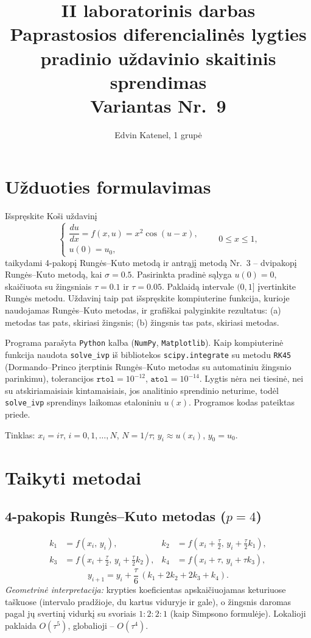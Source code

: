 \documentclass[12pt,a4paper]{article}
\title{\textbf{II laboratorinis darbas}\\[4pt]\large Paprastosios diferencialinės lygties pradinio uždavinio
skaitinis sprendimas\\ Variantas Nr.~9}
\author{Edvin Katenel, 1 grupė}
\date{}
\begin{document}
\maketitle

\section*{Užduoties formulavimas}
Išspręskite Koši uždavinį
\[
  \begin{cases}
    \dfrac{du}{dx}=f(x,u)=x^2\cos(u-x),\\[6pt]
    u(0)=u_0,
  \end{cases}
  \qquad 0\le x\le 1,
\]
taikydami 4-pakopį Rungės--Kuto metodą ir antrąjį metodą Nr.~3 -- dvipakopį Rungės--Kuto metodą,
kai $\sigma=0.5$. Pasirinkta pradinė sąlyga $u(0)=0$, skaičiuota su žingsniais $\tau=0.1$ ir
$\tau=0.05$. Paklaidą intervale $(0,1]$ įvertinkite Rungės metodu. Uždavinį taip pat išspręskite
kompiuterine funkcija, kurioje naudojamas Rungės--Kuto metodas, ir grafiškai palyginkite rezultatus:
(a) metodas tas pats, skiriasi žingsnis; (b) žingsnis tas pats, skiriasi metodas.

Programa parašyta \texttt{Python} kalba (\texttt{NumPy}, \texttt{Matplotlib}). Kaip kompiuterinė
funkcija naudota \texttt{solve\_ivp} iš bibliotekos \texttt{scipy.integrate} su metodu
\texttt{RK45} (Dormando--Princo įterptinis Rungės--Kuto metodas su automatiniu žingsnio
parinkimu), tolerancijos $\texttt{rtol}=10^{-12}$, $\texttt{atol}=10^{-14}$. Lygtis nėra nei
tiesinė, nei su atskiriamaisiais kintamaisiais, jos analitinio sprendinio neturime, todėl
\texttt{solve\_ivp} sprendinys laikomas etaloniniu $u(x)$. Programos kodas pateiktas priede.

Tinklas: $x_i=i\tau$, $i=0,1,\dots,N$, $N=1/\tau$; $y_i\approx u(x_i)$, $y_0=u_0$.

\section{Taikyti metodai}

\subsection{4-pakopis Rungės--Kuto metodas ($p=4$)}
\[
\begin{aligned}
  k_1&=f(x_i,\,y_i), &
  k_2&=f\!\left(x_i+\tfrac{\tau}{2},\,y_i+\tfrac{\tau}{2}k_1\right),\\
  k_3&=f\!\left(x_i+\tfrac{\tau}{2},\,y_i+\tfrac{\tau}{2}k_2\right), &
  k_4&=f(x_i+\tau,\,y_i+\tau k_3),
\end{aligned}
\]
\[
  y_{i+1}=y_i+\frac{\tau}{6}\,(k_1+2k_2+2k_3+k_4).
\]
\emph{Geometrinė interpretacija:} krypties koeficientas apskaičiuojamas keturiuose taškuose
(intervalo pradžioje, du kartus viduryje ir gale), o žingsnis daromas pagal jų svertinį vidurkį
su svoriais $1:2:2:1$ (kaip Simpsono formulėje). Lokalioji paklaida $O(\tau^5)$, globalioji --
$O(\tau^4)$.
\end{document}
